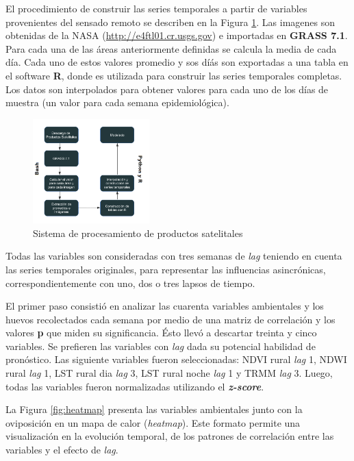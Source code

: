   \par El procedimiento de construir las series temporales a partir de variables
    provenientes del sensado remoto se describen en la Figura \ref{fig:sistema}.
    Las imagenes son obtenidas de la NASA (\url{http://e4ftl01.cr.usgs.gov}) e
    importadas en \textbf{GRASS 7.1}. Para cada una de las áreas anteriormente
    definidas se calcula la media de cada día. Cada uno de estos valores
    promedio y sos díás son exportadas a una tabla en el software \textbf{R},
    donde es utilizada para construir las series temporales completas.
    Los datos son interpolados para obtener valores para cada uno de los
    días de muestra (un valor para cada semana epidemiológica).
    \begin{figure}
    \centering%
    \includegraphics[width=0.4\textwidth]{images/sistema}%
    \caption{Sistema de procesamiento de productos satelitales}\label{fig:sistema}
    \end{figure}

  \par Todas las variables son consideradas con tres semanas de \textit{lag}
  teniendo en cuenta las series temporales originales, para representar las
  influencias asincrónicas, correspondientemente con uno, dos o tres
  lapsos de tiempo.

  \par El primer paso consistió en analizar las cuarenta variables ambientales
    y los huevos recolectados cada semana por medio de una matriz de correlación
    y los valores \textbf{p} que miden su significancia. Ésto llevó a descartar
    treinta y cinco variables. Se prefieren las variables con \textit{lag} dada
    su potencial habilidad de pronóstico. Las siguiente variables fueron
    seleccionadas: NDVI rural \textit{lag} 1, NDWI rural \textit{lag} 1, LST rural dia \textit{lag} 3,
    LST rural noche \textit{lag} 1 y TRMM \textit{lag} 3. Luego, todas las
    variables fueron normalizadas utilizando el \textbf{\textit{z-score}}.

  \par La Figura \ref{fig:heatmap} presenta las variables ambientales junto
    con la oviposición en un mapa de calor (\textit{heatmap}). Este formato
    permite una visualización en la evolución temporal, de los
    patrones de correlación entre las variables y el efecto de \textit{lag}.

